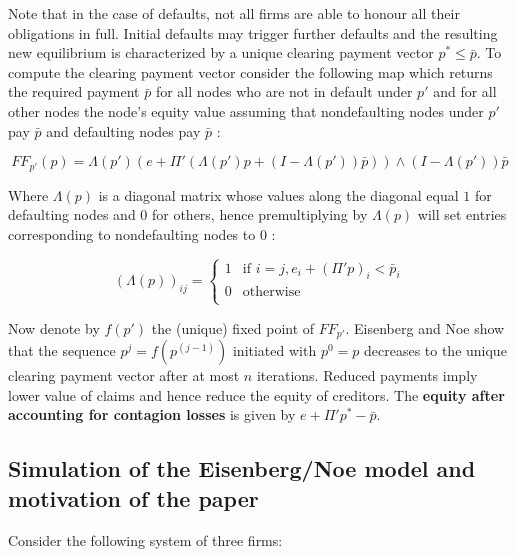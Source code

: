 \documentclass[12pt,a4paper]{article}
\begin{document}
Note that in the case of defaults, not all firms are able to honour all their obligations in full. Initial defaults may trigger further defaults and the resulting new equilibrium is characterized by a unique clearing payment vector $p^* \le \bar{p}$. To compute the clearing payment vector consider the following map which returns the required payment $\bar{p}$ for all nodes who are not in default under $p'$ and for all other nodes the node's equity value assuming that nondefaulting nodes under $p'$ pay $\bar{p}$ and defaulting nodes pay $\bar{p}$ \cite{Eisenberg2001}:

\[
FF_{p'}(p)=\Lambda (p')(e+\Pi'(\Lambda (p')p+(I-\Lambda (p'))\bar{p})) \wedge (I-\Lambda (p'))\bar{p}
\]

Where $\Lambda (p)$ is a diagonal matrix whose values along the diagonal equal $1$ for defaulting nodes and $0$ for others, hence premultiplying by $\Lambda (p)$ will set entries corresponding to nondefaulting nodes to $0$ \cite{Eisenberg2001}:

\[
(\Lambda (p))_{ij}= \begin{cases}
1 & \mbox{if } i=j,e_{i}+(\Pi 'p)_{i}<\bar{p}_{i} \\
0 & \mbox{otherwise} \\
\end{cases}
\]

Now denote by $f(p')$ the (unique) fixed point of $FF_{p'}$. Eisenberg and Noe \cite{Eisenberg2001} show that the sequence $p^j=f(p^(j-1) )$ initiated with $p^0=p$ decreases to the unique clearing payment vector after at most $n$ iterations. Reduced payments imply lower value of claims and hence reduce the equity of creditors. The \textbf{equity after accounting for contagion losses} is given by $e+\Pi' p^* -\bar{p}$.

\subsection{Simulation of the Eisenberg/Noe model and motivation of the paper}
Consider the following system of three firms:
\end{document}
